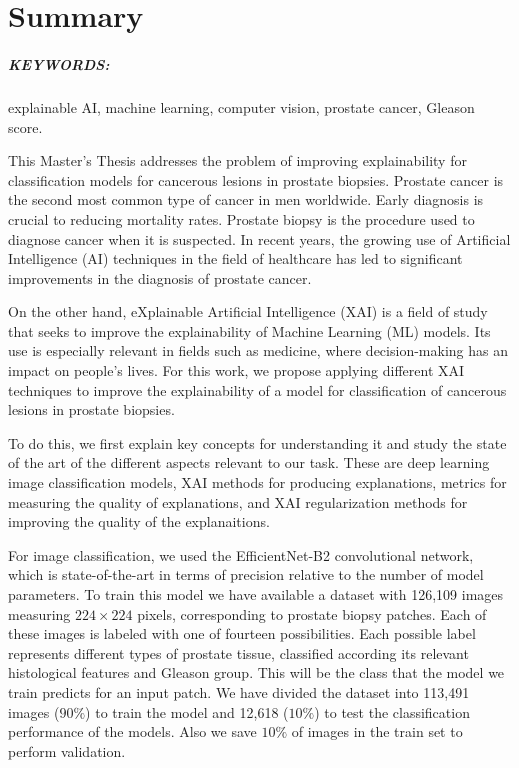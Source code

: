 %

\chapter{Summary}
\paragraph*{KEYWORDS:} explainable AI, machine learning, computer vision, prostate cancer, Gleason score.  

This Master's Thesis addresses the problem of improving explainability for classification models for cancerous lesions in prostate biopsies. Prostate cancer is the second most common type of cancer in men worldwide. Early diagnosis is crucial to reducing mortality rates. Prostate biopsy is the procedure used to diagnose cancer when it is suspected. In recent years, the growing use of Artificial Intelligence (AI) techniques in the field of healthcare has led to significant improvements in the diagnosis of prostate cancer.

On the other hand, eXplainable Artificial Intelligence (XAI) is a field of study that seeks to improve the explainability of Machine Learning (ML) models. Its use is especially relevant in fields such as medicine, where decision-making has an impact on people's lives. For this work, we propose applying different XAI techniques to improve the explainability of a model for classification of cancerous lesions in prostate biopsies.

To do this, we first explain key concepts for understanding it and study the state of the art of the different aspects relevant to our task. These are deep learning image classification models, XAI methods for producing explanations, metrics for measuring the quality of explanations, and XAI regularization methods for improving the quality of the explanaitions.

For image classification, we used the EfficientNet-B2 convolutional network, which is state-of-the-art in terms of precision relative to the number of model parameters. To train this model we have available a dataset with 126,109 images measuring $224 \times 224$ pixels, corresponding to prostate biopsy patches. Each of these images is labeled with one of fourteen possibilities. Each possible label represents different types of prostate tissue, classified according its relevant histological features and Gleason group. This will be the class that the model we train predicts for an input patch. We have divided the dataset into 113,491 images ($90\%$) to train the model and 12,618 ($10\%$) to test the classification performance of the models. Also we save $10\%$ of images in the train set to perform validation.

